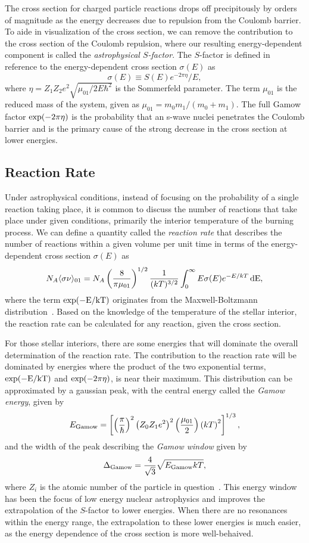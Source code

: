 The cross section for charged particle reactions drops off precipitously
by orders of magnitude as the energy decreases due to repulsion from the
Coulomb barrier. To aide in visualization of the cross section, we can
remove the contribution to the cross section of the Coulomb repulsion,
where our resulting energy-dependent component is called the
\emph{astrophysical $S$-factor}. The $S$-factor is defined in reference
to the energy-dependent cross section $\sigma(E)$ as
\[
    \sigma(E) \equiv S(E)e^{-2\pi\eta} / E,
\]
where $\eta = Z_1Z_2e^2\sqrt{\mu_{01} / 2E\hbar^2}$ is the Sommerfeld
parameter. The term $\mu_{01}$ is the reduced mass of the system, given
as $\mu_{01} = m_0m_1/(m_0 + m_1)$. The full Gamow factor
$\rm{exp}(-2\pi\eta)$ is the probability that an s-wave nuclei
penetrates the Coulomb barrier and is the primary cause of the strong
decrease in the cross section at lower energies.

\subsection{Reaction Rate}

Under astrophysical conditions, instead of focusing on the probability
of a single reaction taking place, it is common to discuss the number of
reactions that take place under given conditions, primarily the interior
temperature of the burning process. We can define a quantity called the
\emph{reaction rate} that describes the number of reactions within a
given volume per unit time in terms of the energy-dependent cross
section $\sigma(E)$ as
\begin{equation}
\label{eq:reaction-rate}
    N_A\langle\sigma\nu\rangle_{01} = N_A\left(\frac{8}{\pi\mu_{01}}\right)^{1/2}
        \frac{1}{(kT)^{3/2}}\int_0^{\infty} E\sigma(E)e^{-E/kT}\,\rm{d}E,
\end{equation}
where the term $\rm{exp}(-E/kT)$ originates from the Maxwell-Boltzmann
distribution~\cite{Iliadis}. Based on the knowledge of the temperature
of the stellar interior, the reaction rate can be calculated for any
reaction, given the cross section.

For those stellar interiors, there are some energies that will dominate
the overall determination of the reaction rate. The contribution to the
reaction rate will be dominated by energies where the product of the two
exponential terms, $\rm{exp}(-E/kT)$ and $\rm{exp}(-2\pi\eta)$, is near
their maximum. This distribution can be approximated by a gaussian peak,
with the central energy called the \emph{Gamow energy}, given by
\[
    E_{\rm{Gamow}} = \left[\left(\frac{\pi}{\hbar}\right)^2
        \left(Z_0Z_1e^2\right)^2\left(\frac{\mu_{01}}{2}\right)
        \left(kT\right)^2\right]^{1/3},
\]
and the width of the peak describing the \emph{Gamow window} given by
\[
    \Delta_{\rm{Gamow}} = \frac{4}{\sqrt{3}}\sqrt{E_{\rm{Gamow}}kT},
\]
where $Z_i$ is the atomic number of the particle in
question~\cite{Iliadis}. This energy window has been the focus of low
energy nuclear astrophysics and improves the extrapolation of the
$S$-factor to lower energies. When there are no resonances within the
energy range, the extrapolation to these lower energies is much easier,
as the energy dependence of the cross section is more well-behaived.

